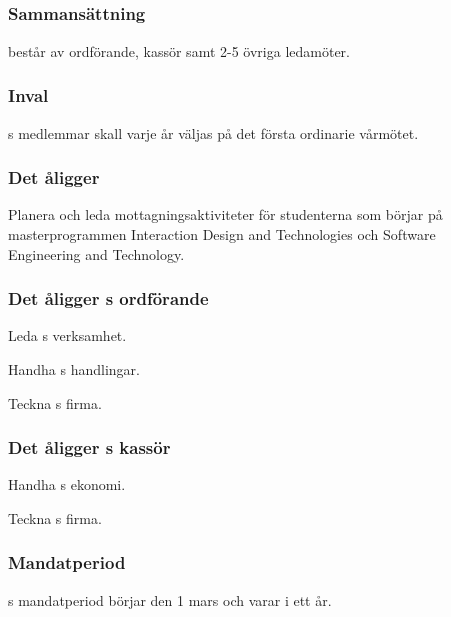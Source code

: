 \subsection{\MRCITFULL}
\subsubsection{Sammansättning}
\MRCIT{} består av ordförande, kassör samt 2-5 övriga ledamöter.

\subsubsection{Inval}
\MRCIT{}s medlemmar skall varje år väljas på det första ordinarie vårmötet.

\subsubsection{Det åligger \MRCIT}
\begin{att}
  \item Planera och leda mottagningsaktiviteter för studenterna som börjar på masterprogrammen Interaction Design and Technologies och Software Engineering and Technology.
\end{att}

\subsubsection{Det åligger \MRCIT{}s ordförande}
\begin{att}
  \item Leda \MRCIT{}s verksamhet.
  \item Handha \MRCIT{}s handlingar.
  \item Teckna \MRCIT{}s firma.
\end{att}

\subsubsection{Det åligger \MRCIT{}s kassör}
\begin{att}
  \item Handha \MRCIT{}s ekonomi.
  \item Teckna \MRCIT{}s firma.
\end{att}

\subsubsection{Mandatperiod}
\MRCIT{}s mandatperiod börjar den 1 mars och varar i ett år.